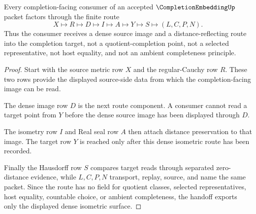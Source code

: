 \begin{theorem}
\label{thm:completion-embedding-dense-isometric-handoff}
Every completion-facing consumer of an accepted $\CompletionEmbeddingUp$ packet factors through the finite route
$$
X\longmapsto R\longmapsto D\longmapsto I\longmapsto A\longmapsto Y\longmapsto S\longmapsto(L,C,P,N).
$$
Thus the consumer receives a dense source image and a distance-reflecting route into the completion target, not a quotient-completion point, not a selected representative, not host equality, and not an ambient completeness principle.
\end{theorem}
\begin{proof}
Start with the source metric row $X$ and the regular-Cauchy row $R$. These two rows provide the displayed source-side data from which the completion-facing image can be read.

The dense image row $D$ is the next route component. A consumer cannot read a target point from $Y$ before the dense source image has been displayed through $D$.

The isometry row $I$ and Real seal row $A$ then attach distance preservation to that image. The target row $Y$ is reached only after this dense isometric route has been recorded.

Finally the Hausdorff row $S$ compares target reads through separated zero-distance evidence, while $L,C,P,N$ transport, replay, source, and name the same packet. Since the route has no field for quotient classes, selected representatives, host equality, countable choice, or ambient completeness, the handoff exports only the displayed dense isometric surface.
\end{proof}

